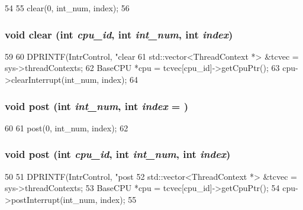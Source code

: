 \begin{DoxyCode}
54     {
55         clear(0, int_num, index);
56     }
\end{DoxyCode}
\hypertarget{classIntrControl_a82089f360a335ee396b89d844c278968}{
\subsubsection[{clear}]{\setlength{\rightskip}{0pt plus 5cm}void clear (int {\em cpu\_\-id}, \/  int {\em int\_\-num}, \/  int {\em index})}}
\label{classIntrControl_a82089f360a335ee396b89d844c278968}



\begin{DoxyCode}
59 {
60     DPRINTF(IntrControl, "clear %
61     std::vector<ThreadContext *> &tcvec = sys->threadContexts;
62     BaseCPU *cpu = tcvec[cpu_id]->getCpuPtr();
63     cpu->clearInterrupt(int_num, index);
64 }
\end{DoxyCode}
\hypertarget{classIntrControl_ad3c0d3b058eaa42aa0181bd1dc61e3c9}{
\subsubsection[{post}]{\setlength{\rightskip}{0pt plus 5cm}void post (int {\em int\_\-num}, \/  int {\em index} = {})}}
\label{classIntrControl_ad3c0d3b058eaa42aa0181bd1dc61e3c9}



\begin{DoxyCode}
60     {
61         post(0, int_num, index);
62     }
\end{DoxyCode}
\hypertarget{classIntrControl_aa6e4c477d43213ac8c5adc393174e293}{
\subsubsection[{post}]{\setlength{\rightskip}{0pt plus 5cm}void post (int {\em cpu\_\-id}, \/  int {\em int\_\-num}, \/  int {\em index})}}
\label{classIntrControl_aa6e4c477d43213ac8c5adc393174e293}



\begin{DoxyCode}
50 {
51     DPRINTF(IntrControl, "post  %
52     std::vector<ThreadContext *> &tcvec = sys->threadContexts;
53     BaseCPU *cpu = tcvec[cpu_id]->getCpuPtr();
54     cpu->postInterrupt(int_num, index);
55 }
\end{DoxyCode}


